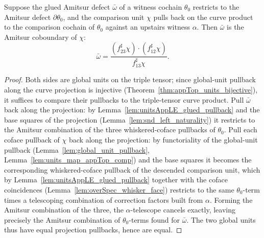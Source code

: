 \begin{theorem}
  \label{thm:glued_defect_eq_amitsur_coboundary}
  \leanok
  Suppose the glued Amitsur defect \(\bar\omega\) of a witness cochain \(\theta_0\) restricts to
  the Amitsur defect \(\partial\theta_0\), and the comparison unit \(\chi\) pulls back on the
  curve product to the comparison cochain of \(\theta_0\) against an upstairs witness
  \(\alpha\). Then \(\bar\omega\) is the Amitsur coboundary of \(\chi\):
  \[
    \bar\omega
      = \frac{(f_{23}^{\sharp}\chi) \cdot (f_{12}^{\sharp}\chi)}{f_{13}^{\sharp}\chi} .
  \]
\end{theorem}
\begin{proof}
  \leanok
  Both sides are global units on the triple tensor; since global-unit pullback along the curve
  projection is injective (Theorem~\ref{thm:appTop_units_bijective}), it suffices to compare
  their pullbacks to the triple-tensor curve product. Pull \(\bar\omega\) back along the
  projection: by Lemma~\ref{lem:unitsAppLE_glued_pullback} and the base squares of the
  projection (Lemma~\ref{lem:snd_left_naturality}) it restricts to the Amitsur combination of
  the three whiskered-coface pullbacks of \(\theta_0\). Pull each coface pullback of \(\chi\)
  back along the projection: by functoriality of the global-unit pullback
  (Lemma~\ref{lem:global_unit_pullback}, Lemma~\ref{lem:units_map_appTop_comp}) and the base
  squares it becomes the corresponding whiskered-coface pullback of the descended comparison
  unit, which by Lemma~\ref{lem:unitsAppLE_glued_pullback} together with the coface coincidences
  (Lemma~\ref{lem:overSpec_whisker_face}) restricts to the same \(\theta_0\)-term times a
  telescoping combination of correction factors built from \(\alpha\). Forming the Amitsur
  combination of the three, the \(\alpha\)-telescope cancels exactly, leaving precisely the
  Amitsur combination of \(\theta_0\)-terms found for \(\bar\omega\). The two global units thus
  have equal projection pullbacks, hence are equal.
\end{proof}

